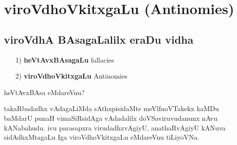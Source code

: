 \chapter{viroVdhoVkitxgaLu (\rm Antinomies)}

\section*{viroVdhA BAsagaLalilx eraDu vidha}
\begin{itemize}
\item[{\rm 1)}] {\bf heVtAvxBAsagaLu} {\rm fallacies}
\item[{\rm 2)}] {\bf viroVdhoVkitxgaLu} {\rm Antinomies}
\end{itemize}

heVtAvxBAsa eMdareVnu?

takaRbadadhx vAdagaLiMda sAthxpisidaMte meVlfnoVTakekx kaMDu baMdarU punaH vimaSiRsidAga vAdadalilx doVSaviruvudanunx nAvu kANabahudu. ivu parasapxra virudadhxvAgiyU, anathaRvAgiyU kANuva sidAdhxMtagaLu Iga viroVdhoVkitxgaLu eMdareVnu tiLiyoVNa.

